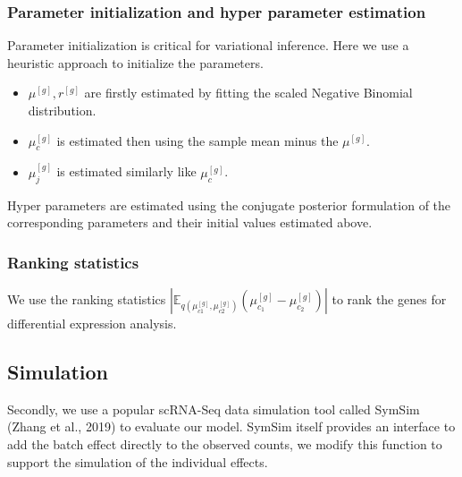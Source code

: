 \documentclass[fleqn,10pt]{wlscirep}
\newcommand{\mye}{\mathbb{E}}
\begin{document}
\subsubsection*{Parameter initialization and hyper parameter estimation}
Parameter initialization is critical for variational inference. Here we use a
heuristic approach to initialize the parameters.
\begin{itemize}
\item \(\mu^{[g]}, r^{[g]}\) are firstly estimated by fitting the scaled Negative
  Binomial distribution.
\item
  \(\mu_c^{[g]}\) is estimated then using the sample mean minus the \(\mu^{[g]}\).
\item
  \(\mu_j^{[g]}\) is estimated similarly like \(\mu_c^{[g]}\).
\end{itemize}

Hyper parameters are estimated using the conjugate posterior formulation of the
corresponding parameters and their initial values estimated above.

\subsubsection*{Ranking statistics}
We use the ranking statistics \(\left|\mye_{q(\mu_{c1}^{[g]},
  \mu_{c2}^{[g]})}(\mu_{c_1}^{[g]}-\mu_{c_2}^{[g]})\right|\) to rank the genes for
differential expression analysis.

\subsection*{Simulation}
Secondly, we use a popular scRNA-Seq data simulation tool called SymSim (Zhang
et al., 2019) to evaluate our model. SymSim itself provides an
interface to add the batch effect directly to the observed counts, we
modify this function to support the simulation of the individual
effects.
\end{document}
